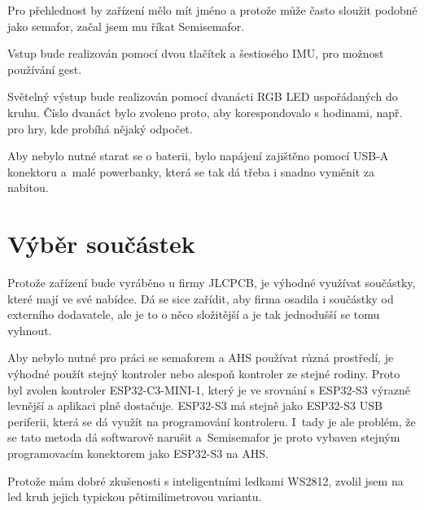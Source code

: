 


Pro přehlednost by zařízení mělo mít jméno a protože může často sloužit podobně jako semafor, začal jsem mu říkat Semisemafor.

Vstup bude realizován pomocí dvou tlačítek a šestiosého IMU, pro možnost používání gest.

Světelný výstup bude realizován pomocí dvanácti RGB LED uspořádaných do kruhu.
Číslo dvanáct bylo zvoleno proto, aby korespondovalo s hodinami, např. pro hry, kde probíhá nějaký odpočet.

Aby nebylo nutné starat se o baterii, bylo napájení zajištěno pomocí USB-A konektoru a~malé powerbanky, která se tak dá třeba i snadno vyměnit za nabitou.

\section{Výběr součástek}
Protože zařízení bude vyráběno u firmy JLCPCB, je výhodné využívat součástky, které mají ve své nabídce.
Dá se sice zařídit, aby firma osadila i součástky od externího dodavatele, ale je to o něco složitější a je tak jednodušší se tomu vyhnout.

Aby nebylo nutné pro práci se semaforem a AHS používat různá prostředí, je výhodné použít stejný kontroler nebo alespoň kontroler ze stejné rodiny.
Proto byl zvolen kontroler ESP32-C3-MINI-1, který je ve srovnání s ESP32-S3 výrazně levnější a aplikaci plně dostačuje. 
ESP32-S3 má stejně jako ESP32-S3 USB periferii, která se dá využít na programování kontroleru.
I~tady je ale problém, že se tato metoda dá softwarově narušit a~Semisemafor je proto vybaven stejným programovacím konektorem jako ESP32-S3 na AHS.

Protože mám dobré zkušenosti s inteligentními ledkami WS2812, zvolil jsem na led kruh jejich typickou pětimilimetrovou variantu.

